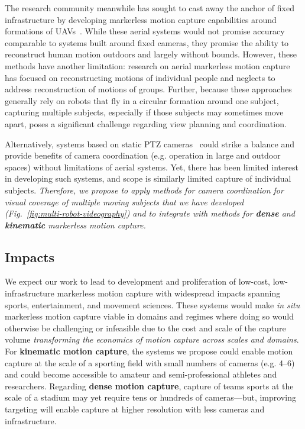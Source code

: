 \documentclass[11pt]{article}
\begin{document}
The research community meanwhile has sought to cast away the anchor of
fixed infrastructure by developing markerless motion capture capabilities around
formations of UAVs~\citep{saini2019iccv,ho2021iros,hong2024eccv,saini2022ral}.
While these aerial systems would not promise accuracy comparable to systems
built around fixed cameras, they promise the ability to reconstruct human motion
outdoors and largely without bounds.
However, these methods have another limitation: research on
aerial markerless motion capture has focused on reconstructing
motions of individual people and neglects to address reconstruction of motions
of groups.
Further, because these approaches generally rely on robots that fly in a
circular formation around one subject, capturing multiple subjects, especially
if those subjects may sometimes move apart, poses a significant challenge
regarding view planning and coordination.

Alternatively, systems based on static PTZ
cameras~\citep{bachmann20193dv,yamamoto2022visigrapp}
could strike a balance and provide benefits of camera coordination
(e.g. operation in large and outdoor spaces) without limitations of aerial
systems.
Yet, there has been limited interest in developing such systems, and scope is
similarly limited capture of individual subjects.
\emph{Therefore, we propose to apply methods for camera coordination for visual
  coverage of multiple moving subjects that we have
  developed~\citep{hughes2024cdc,suresh2024iros,bouy2026}
(Fig.~\ref{fig:multi-robot-videography}) and to integrate with
methods for \textbf{dense} and \textbf{kinematic} markerless motion capture.}

\subsection{Impacts}

We expect our work to lead to development and proliferation of
low-cost, low-infrastructure markerless motion capture with widespread
impacts spanning sports, entertainment, and movement sciences.
These systems would make \emph{in situ} markerless motion capture viable in
domains and regimes where doing so would otherwise be challenging or infeasible
due to the cost and scale of the capture volume
\emph{transforming the economics of motion capture across scales and domains}.
For \textbf{kinematic motion capture}, the systems we propose could enable
motion capture at the scale of a sporting field with small numbers of
cameras (e.g. 4--6) and could become accessible to amateur and semi-professional
athletes and researchers.
Regarding \textbf{dense motion capture}, capture of teams sports at
the scale of a stadium may yet require tens or hundreds of cameras---but,
improving targeting will enable capture at higher resolution with less cameras
and infrastructure.
\end{document}
